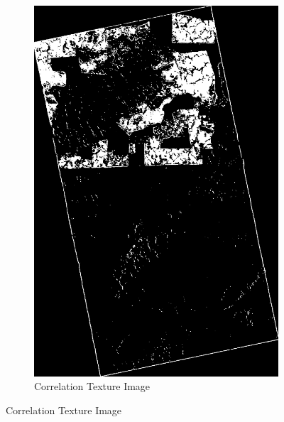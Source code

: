 \begin{figure}
\begin{subfigure}[b]{0.4\linewidth}
      \includegraphics[width=\linewidth]{Cap3-Results/sum_and_diff_textures/correlationimage.png}
       \caption{Correlation Texture Image}
    \end{subfigure}
  \end{figure}
  \newpage
